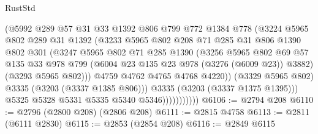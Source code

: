 \begin{lexlean}{RustStd}
\begin{coremodule}
                            (@5992
                              @289
                              @57
                              @31
                              @33
                              @1392
                              @806
                              @799
                              @772
                              @1384
                              @778
                              (@3224
                                @5965
                                @802
                                @289
                                @31
                                @1392
                                (@3233
                                  @5965
                                  @802
                                  @208
                                  @71
                                  @285
                                  @31
                                  @806
                                  @1390
                                  @802
                                  @301
                                  (@3247
                                    @5965
                                    @802
                                    @71
                                    @285
                                    @1390
                                    (@3256
                                      @5965
                                      @802
                                      @69
                                      @57
                                      @135
                                      @33
                                      @978
                                      @799
                                      (@6004 @23 @135 @23 @978 (@3276 (@6009 @23)) @3882)
                                      (@3293 @5965 @802)))
                                  @4759
                                  @4762
                                  @4765
                                  @4768
                                  @4220))
                              (@3329 @5965 @802)
                              @3335
                              (@3203 (@3337 @1385 @806)))
                            @3335
                            (@3203 (@3337 @1375 @1395)))
                          @5325
                          @5328
                          @5331
                          @5335
                          @5340
                          @5346)))))))))))
@6106 := @2794 @208
@6110 := @2796 (@2800 @208) (@2806 @208)
@6111 := @2815 @4758
@6113 := @2811 (@6111 @2830)
@6115 := @2853 (@2854 @208)
@6116 := @2849 @6115

\end{coremodule}
\end{lexlean}
